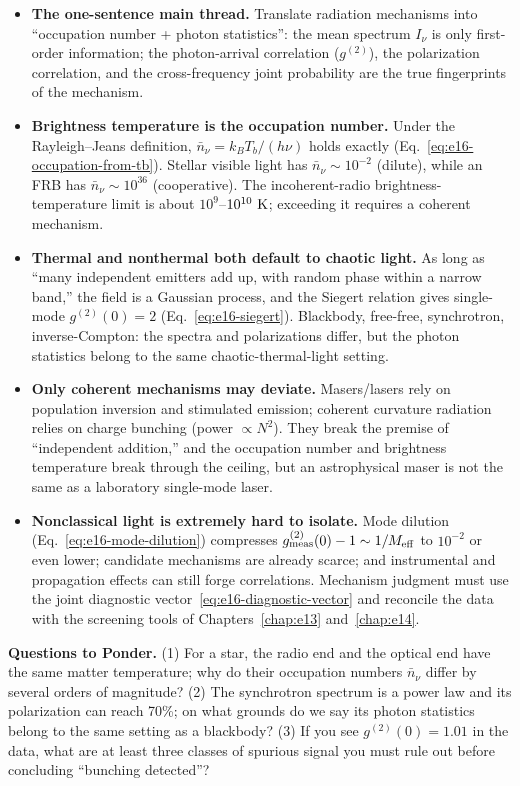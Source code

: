 \begin{itemize}
  \item \textbf{The one-sentence main thread.} Translate radiation mechanisms into ``occupation number + photon statistics'': the mean spectrum \(I_\nu\) is only first-order information; the photon-arrival correlation (\(g^{(2)}\)), the polarization correlation, and the cross-frequency joint probability are the true fingerprints of the mechanism.
  \item \textbf{Brightness temperature is the occupation number.} Under the Rayleigh--Jeans definition, \(\bar n_\nu=k_BT_b/(h\nu)\) holds exactly (Eq.~\eqref{eq:e16-occupation-from-tb}). Stellar visible light has \(\bar n_\nu\sim10^{-2}\) (dilute), while an FRB has \(\bar n_\nu\sim10^{36}\) (cooperative). The incoherent-radio brightness-temperature limit is about \(10^{9}\)--\(10^{10}~{\rm K}\); exceeding it requires a coherent mechanism.
  \item \textbf{Thermal and nonthermal both default to chaotic light.} As long as ``many independent emitters add up, with random phase within a narrow band,'' the field is a Gaussian process, and the Siegert relation gives single-mode \(g^{(2)}(0)=2\) (Eq.~\eqref{eq:e16-siegert}). Blackbody, free-free, synchrotron, inverse-Compton: the spectra and polarizations differ, but the photon statistics belong to the same chaotic-thermal-light setting.
  \item \textbf{Only coherent mechanisms may deviate.} Masers/lasers rely on population inversion and stimulated emission; coherent curvature radiation relies on charge bunching (power \(\propto N^2\)). They break the premise of ``independent addition,'' and the occupation number and brightness temperature break through the ceiling, but an astrophysical maser is not the same as a laboratory single-mode laser.
  \item \textbf{Nonclassical light is extremely hard to isolate.} Mode dilution (Eq.~\eqref{eq:e16-mode-dilution}) compresses \(g^{(2)}_{\rm meas}(0)-1\sim1/M_{\rm eff}\) to \(10^{-2}\) or even lower; candidate mechanisms are already scarce; and instrumental and propagation effects can still forge correlations. Mechanism judgment must use the joint diagnostic vector~\eqref{eq:e16-diagnostic-vector} and reconcile the data with the screening tools of Chapters~\ref{chap:e13} and~\ref{chap:e14}.
\end{itemize}

\noindent\textbf{Questions to Ponder.} (1) For a star, the radio end and the optical end have the same matter temperature; why do their occupation numbers \(\bar n_\nu\) differ by several orders of magnitude? (2) The synchrotron spectrum is a power law and its polarization can reach 70\%; on what grounds do we say its photon statistics belong to the same setting as a blackbody? (3) If you see \(g^{(2)}(0)=1.01\) in the data, what are at least three classes of spurious signal you must rule out before concluding ``bunching detected''?
